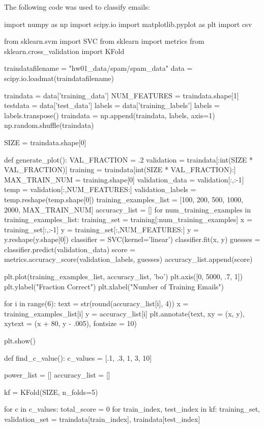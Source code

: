 \documentclass[11pt]{article}
\begin{document}
\newpage
The following code was used to classify emails:
\begin{python}
import numpy as np
import scipy.io
import matplotlib.pyplot as plt
import csv

from sklearn.svm import SVC
from sklearn import metrics
from sklearn.cross_validation import KFold

traindatafilename = "hw01_data/spam/spam_data"
data = scipy.io.loadmat(traindatafilename)

traindata = data['training_data']
NUM_FEATURES = traindata.shape[1]
testdata = data['test_data']
labels = data['training_labels']
labels = labels.transpose()
traindata = np.append(traindata, labels, axis=1)
np.random.shuffle(traindata)

SIZE = traindata.shape[0]

def generate_plot():
    VAL_FRACTION = .2
    validation = traindata[:int(SIZE * VAL_FRACTION)]
    training = traindata[int(SIZE * VAL_FRACTION):]
    MAX_TRAIN_NUM = training.shape[0]
    validation_data = validation[:,:-1]
    temp = validation[:,NUM_FEATURES:]
    validation_labels = temp.reshape(temp.shape[0])
    training_examples_list = [100, 200, 500, 1000, 2000, MAX_TRAIN_NUM]
    accuracy_list = []
    for num_training_examples in training_examples_list:
        training_set = training[:num_training_examples]
        x = training_set[:,:-1]
        y = training_set[:,NUM_FEATURES:]
        y = y.reshape(y.shape[0])
        classifier = SVC(kernel='linear')
        classifier.fit(x, y)
        guesses = classifier.predict(validation_data)
        score = metrics.accuracy_score(validation_labels, guesses)
        accuracy_list.append(score)

    plt.plot(training_examples_list, accuracy_list, 'bo')
    plt.axis([0, 5000, .7, 1])
    plt.ylabel("Fraction Correct")
    plt.xlabel("Number of Training Emails")

    for i in range(6):
        text = str(round(accuracy_list[i], 4))
        x = training_examples_list[i]
        y = accuracy_list[i]
        plt.annotate(text, xy = (x, y), xytext = (x + 80, y - .005), fontsize = 10)

    plt.show()

def find_c_value():
    c_values = [.1, .3, 1, 3, 10]

    power_list = []
    accuracy_list = []

    kf = KFold(SIZE, n_folds=5)

    for c in c_values:
        total_score = 0
        for train_index, test_index in kf:
            training_set, validation_set = traindata[train_index], traindata[test_index]


\end{python}
\end{document}
